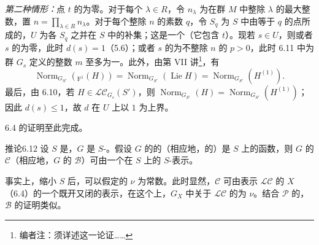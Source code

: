 \emph{第二种情形：}点 $t$ 的为零。对于每个 $\lambda\in R$，令 $n_{\lambda}$ 为在群 $M$ 中整除 $\lambda$ 的最大整数，置 $n=\prod_{\lambda\in R}n_{\lambda}$。对于每个整除 $n$ 的素数 $q$，令 $S_q$ 为 $S$ 中由等于 $q$ 的点所成的，$U$ 为各 $S_q$ 之并在 $S$ 中的补集；这是一个（它包含 $t$）。现若 $s\in U$，则或者 $s$ 的为零，此时 $d(s)=1$（5.6）；或者 $s$ 的为不整除 $n$ 的 $p>0$，此时 6.11 中为群 $G_s$ 定义的整数 $m$ 至多为一。此外，由第 VII 讲\footnote{编者注：须详述这一论证……}，有
\[\operatorname{Norm}_{G_{S'}}({}_{\mathrm F^1}(H))=\operatorname{Norm}_{G_{S'}}(\operatorname{Lie}H)=\operatorname{Norm}_{G_{S'}}(H^{(1)}).\]
最后，由 6.10，若 $H\in\mathscr L\mathscr C_{G_s}(S')$，则 $\operatorname{Norm}_{G_{S'}}(H)=\operatorname{Norm}_{G_{S'}}(H^{(1)})$；因此 $d(s)\leq1$，故 $d$ 在 $U$ 上以 $1$ 为上界。

6.4 的证明至此完成。
\begin{SGAresult}{推论}{6.12}
设 $S$ 是，$G$ 是 $S$-。假设 $G$ 的的（相应地，的）是 $S$ 上的函数，则 $G$ 的 $\mathscr C$（相应地，$G$ 的 $\mathscr B$）可由一个在 $S$ 上的 $S$-表示。
\end{SGAresult}
事实上，缩小 $S$ 后，可以假定的 $\nu$ 为常数。此时显然，$\mathscr C$ 可由表示 $\mathscr L\mathscr C$ 的 $X$（6.4）的一个既开又闭的表示，在这个上，$G_X$ 中关于 $\mathscr L\mathscr C$ 的为 $\nu$。结合 $\mathscr P$ 的， $\mathscr B$ 的证明类似。
